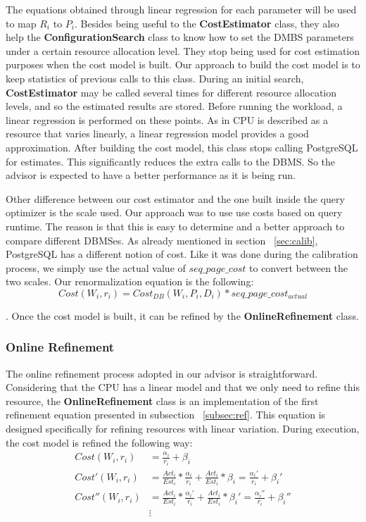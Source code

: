 \documentclass[jidm,a4paper]{jidm} %
\begin{document}
The equations obtained through linear regression for each parameter will be used to map $R_{i}$ to $P_{i}$. Besides being useful to the \textbf{CostEstimator} class, they also help the \textbf{ConfigurationSearch} class to know how to set the DMBS parameters under a certain resource allocation level. They stop being used for cost estimation purposes when the cost model is built. Our approach to build the cost model is to keep statistics of previous calls to this class. During an initial search, \textbf{CostEstimator} may be called several times for different resource allocation levels, and so the estimated results are stored. Before running the workload, a linear regression is performed on these points. As in \cite{Soror:2008:AVM:1376616.1376711} CPU is described as a resource that varies linearly, a linear regression model provides a good approximation. After building the cost model, this class stops calling PostgreSQL for estimates. This significantly reduces the extra calls to the DBMS. So the advisor is 
expected to have a better performance as it is being run.

Other difference between our cost estimator and the one built inside the query optimizer is the scale used. Our approach was to use use costs based on query runtime. The reason is that this is easy to determine and a better approach to compare different DBMSes. As already mentioned in section ~\ref{sec:calib}, PostgreSQL has a different notion of cost. Like it was done during the calibration process, we simply use the actual value of $seq\_page\_cost$ to convert between the two scales. Our renormalization equation is the following:
\[
 Cost(W_{i}, r_{i}) = Cost_{DB}(W_{i},P_{i},D_{i}) * seq\_page\_cost_{actual}
\]

. Once the cost model is built, it can be refined by the \textbf{OnlineRefinement} class.

\subsubsection{Online Refinement}

The online refinement process adopted in our advisor is straightforward. Considering that the CPU has a linear model and that we only need to refine this resource, the \textbf{OnlineRefinement} class  is an implementation of the first refinement equation presented in subsection ~\ref{subsec:ref}. This equation is designed specifically for refining resources with linear variation. During execution, the cost model is refined the following way:
\begin{equation}
 \begin{split}
   Cost(W_{i}, r_{i}) & = \frac{\alpha_{i}}{r_{i}} +\beta_{i} \\
   Cost'(W_{i}, r_{i}) & = \frac{Act_{i}}{Est_{i}} * \frac{\alpha_{i}}{r_{i}} + \frac{Act_{i}}{Est_{i}} * \beta_{i} = \frac{\alpha_{i}'}{r_{i}} +\beta_{i}' \\
   Cost''(W_{i}, r_{i}) & = \frac{Act_{i}}{Est_{i}} * \frac{\alpha_{i}'}{r_{i}} + \frac{Act_{i}}{Est_{i}} * \beta_{i}' = \frac{\alpha_{i}''}{r_{i}} +\beta_{i}'' \\
    & \vdots
 \end{split}
\end{equation}
\end{document}
